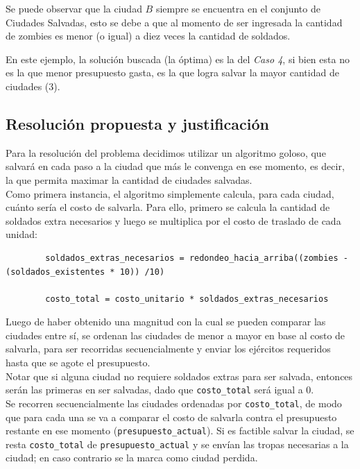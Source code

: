 Se puede observar que la ciudad $B$ siempre se encuentra en el conjunto de Ciudades Salvadas, esto se debe a que al momento de ser ingresada la cantidad de zombies es menor (o igual) a diez veces la cantidad de soldados. 

En este ejemplo, la soluci\'on buscada (la \'optima) es la del \emph{Caso 4}, si bien esta no es la que menor presupuesto gasta, es la que logra salvar la mayor cantidad de ciudades (3).

\newpage
\subsection{Resoluci\'on propuesta y justificaci\'on}

Para la resoluci\'on del problema decidimos utilizar un algoritmo goloso, que salvar\'a en cada paso a la ciudad que m\'as le convenga en ese momento, es decir, la que permita maximar la cantidad de ciudades salvadas.\\

Como primera instancia, el algoritmo simplemente calcula, para cada ciudad, cu\'anto ser\'ia el costo de salvarla. Para ello, primero se calcula la cantidad de soldados extra necesarios y luego se multiplica por el costo de traslado de cada unidad:\\


	\begin{codesnippet}
	\begin{verbatim}
		soldados_extras_necesarios = redondeo_hacia_arriba((zombies - (soldados_existentes * 10)) /10)
		
		costo_total = costo_unitario * soldados_extras_necesarios
	\end{verbatim}
	\end{codesnippet}

Luego de haber obtenido una magnitud con la cual se pueden comparar las ciudades entre s\'i, se ordenan las ciudades de menor a mayor en base al costo de salvarla, para ser recorridas secuencialmente y enviar los ej\'ercitos requeridos hasta que se agote el presupuesto.\\

Notar que si alguna ciudad no requiere soldados extras para ser salvada, entonces ser\'an las primeras en ser salvadas, dado que \texttt{costo_total} ser\'a igual a 0.\\
 
Se recorren secuencialmente las ciudades ordenadas por \texttt{costo_total}, de modo que para cada una se va a comparar el costo de salvarla contra el presupuesto restante en ese momento (\texttt{presupuesto_actual}). Si es factible salvar la ciudad, se resta \texttt{costo_total} de \texttt{presupuesto_actual} y se env\'ian las tropas necesarias a la ciudad; en caso contrario se la marca como ciudad perdida.\\

